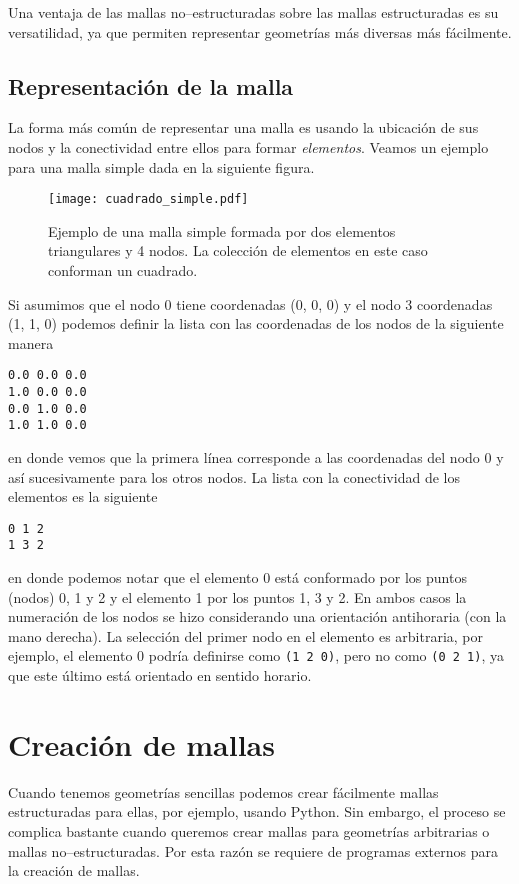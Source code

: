 Una ventaja de las mallas no--estructuradas sobre las mallas estructuradas es su versatilidad, ya que permiten representar geometrías más diversas más fácilmente.


\subsection{Representación de la malla}
La forma más común de representar una malla es usando la ubicación de sus nodos y la conectividad entre ellos para formar \emph{elementos}. Veamos un ejemplo para una malla simple dada en la siguiente figura.
\begin{figure}[H]
    \centering
    \texttt{[image: cuadrado\_simple.pdf]}
    \caption{Ejemplo de una malla simple formada por dos elementos triangulares y 4 nodos. La colección de elementos en este caso conforman un cuadrado.}
\end{figure}

Si asumimos que el nodo 0 tiene coordenadas (0, 0, 0) y el nodo 3 coordenadas (1, 1, 0) podemos definir la lista con las coordenadas de los nodos de la siguiente manera
\begin{verbatim}
0.0 0.0 0.0
1.0 0.0 0.0
0.0 1.0 0.0
1.0 1.0 0.0
\end{verbatim}
en donde vemos que la primera línea corresponde a las coordenadas del nodo 0 y así sucesivamente para los otros nodos. La lista con la conectividad de los elementos es la siguiente
\begin{verbatim}
0 1 2
1 3 2
\end{verbatim}
en donde podemos notar que el elemento 0 está conformado por los puntos (nodos) 0, 1 y 2 y el elemento 1 por los puntos 1, 3 y 2. En ambos casos la numeración de los nodos se hizo considerando una orientación antihoraria (con la mano derecha). La selección del primer nodo en el elemento es arbitraria, por ejemplo, el elemento 0 podría definirse como \texttt{(1 2 0)}, pero no como \texttt{(0 2 1)}, ya que este último está orientado en sentido horario.

\section{Creación de mallas}
Cuando tenemos geometrías sencillas podemos crear fácilmente mallas estructuradas para ellas, por ejemplo, usando Python. Sin embargo, el proceso se complica bastante cuando queremos crear mallas para geometrías arbitrarias o mallas no--estructuradas. Por esta razón se requiere de programas externos para la creación de mallas.

